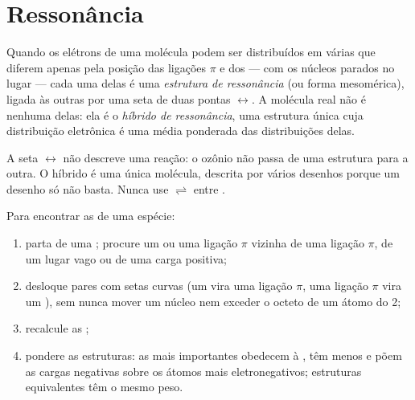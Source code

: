 \section{Ressonância}

\begin{definition}\label{def:b1:lewis-resonance-vsepr:resonance}
Quando os elétrons de uma molécula podem ser distribuídos em várias
 que diferem apenas pela posição das ligações $\pi$
e dos  --- com os núcleos parados no lugar --- cada
uma delas é uma \emph{estrutura de
ressonância} (ou forma mesomérica), ligada
às outras por uma seta de duas pontas $\leftrightarrow$. A molécula real
não é nenhuma delas: ela é o \emph{híbrido de ressonância},
uma estrutura única cuja distribuição eletrônica é uma média ponderada
das distribuições delas.
\end{definition}

\begin{remark}\label{rem:b1:lewis-resonance-vsepr:arrow}
A seta $\leftrightarrow$ não descreve uma reação: o ozônio não passa de
uma estrutura para a outra. O híbrido é uma única molécula, descrita por
vários desenhos porque um desenho só não basta. Nunca use
$\rightleftharpoons$ entre .
\end{remark}

\begin{method}\label{met:b1:lewis-resonance-vsepr:resonance}
Para encontrar as  de uma espécie:
\begin{enumerate}
  \item parta de uma ; procure um  ou
        uma ligação $\pi$ vizinha de uma ligação $\pi$, de um lugar vago
        ou de uma carga positiva;
  \item desloque pares com setas curvas (um  vira uma
        ligação $\pi$, uma ligação $\pi$ vira um ), sem
        nunca mover um núcleo nem exceder o octeto de um átomo do  2;
  \item recalcule as ;
  \item pondere as estruturas: as mais importantes obedecem à , têm menos  e põem as cargas negativas sobre
        os átomos mais eletronegativos; estruturas equivalentes têm o
        mesmo peso.
\end{enumerate}
\end{method}

